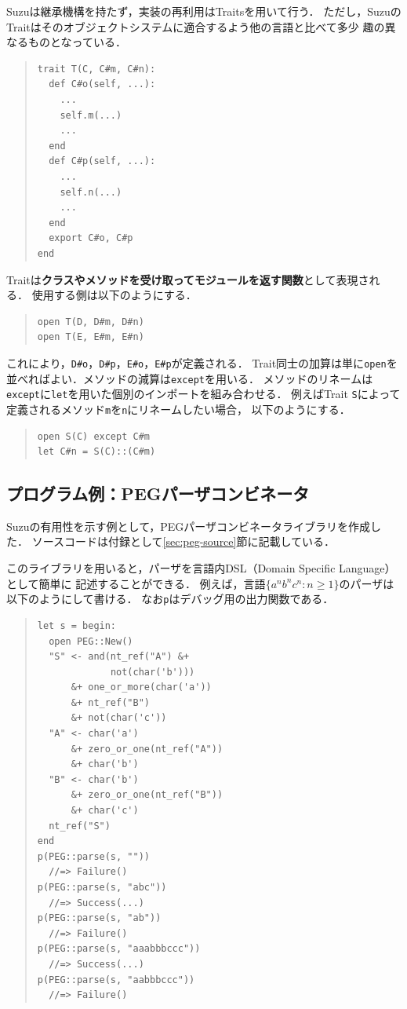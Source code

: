 \documentclass{ipsjprosym}
\begin{document}
Suzuは継承機構を持たず，実装の再利用はTraits\cite{Scharli:2003}を用いて行う．
ただし，SuzuのTraitはそのオブジェクトシステムに適合するよう他の言語と比べて多少
趣の異なるものとなっている．
\begin{quote}
\begin{verbatim}
trait T(C, C#m, C#n):
  def C#o(self, ...):
    ...
    self.m(...)
    ...
  end
  def C#p(self, ...):
    ...
    self.n(...)
    ...
  end
  export C#o, C#p
end
\end{verbatim}
\end{quote}
Traitは\textbf{クラスやメソッドを受け取ってモジュールを返す関数}として表現される．
使用する側は以下のようにする．
\begin{quote}
\begin{verbatim}
open T(D, D#m, D#n)
open T(E, E#m, E#n)
\end{verbatim}
\end{quote}
これにより，\verb|D#o|，\verb|D#p|，\verb|E#o|，\verb|E#p|が定義される．
Trait同士の加算は単に\verb|open|を並べればよい．メソッドの減算は\verb|except|を用いる．
メソッドのリネームは\verb|except|に\verb|let|を用いた個別のインポートを組み合わせる．
例えばTrait \verb|S|によって定義されるメソッド\verb|m|を\verb|n|にリネームしたい場合，
以下のようにする．
\begin{quote}
\begin{verbatim}
open S(C) except C#m
let C#n = S(C)::(C#m)
\end{verbatim}
\end{quote}

\subsection{プログラム例：PEGパーザコンビネータ}

Suzuの有用性を示す例として，PEGパーザコンビネータライブラリを作成した．
ソースコードは付録として\ref{sec:peg-source}節に記載している．

このライブラリを用いると，パーザを言語内DSL（Domain Specific Language）として簡単に
記述することができる．
例えば，言語$\{a^n b^n c^n:n\ge1\}$のパーザは以下のようにして書ける．
なお\verb|p|はデバッグ用の出力関数である．

\begin{quote}
\begin{verbatim}
let s = begin:
  open PEG::New()
  "S" <- and(nt_ref("A") &+
             not(char('b')))
      &+ one_or_more(char('a'))
      &+ nt_ref("B")
      &+ not(char('c'))
  "A" <- char('a')
      &+ zero_or_one(nt_ref("A"))
      &+ char('b')
  "B" <- char('b')
      &+ zero_or_one(nt_ref("B"))
      &+ char('c')
  nt_ref("S")
end
p(PEG::parse(s, ""))
  //=> Failure()
p(PEG::parse(s, "abc"))
  //=> Success(...)
p(PEG::parse(s, "ab"))
  //=> Failure()
p(PEG::parse(s, "aaabbbccc"))
  //=> Success(...)
p(PEG::parse(s, "aabbbccc"))
  //=> Failure()
\end{verbatim}
\end{quote}
\end{document}
